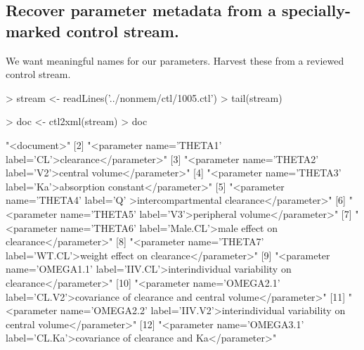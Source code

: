 \subsection{Recover parameter metadata from a specially-marked control stream.}
We want meaningful names for our parameters.  Harvest these from a reviewed control
stream.
\begin{Schunk}
\begin{Sinput}
> stream <- readLines('../nonmem/ctl/1005.ctl')
> tail(stream)
\end{Sinput}
\begin{Sinput}
> doc <- ctl2xml(stream)
> doc
\end{Sinput}
\begin{Soutput}
 [1] "<document>"                                                                                         
 [2] "<parameter name='THETA1' label='CL'>clearance</parameter>"                                          
 [3] "<parameter name='THETA2' label='V2'>central volume</parameter>"                                     
 [4] "<parameter name='THETA3' label='Ka'>absorption constant</parameter>"                                
 [5] "<parameter name='THETA4' label='Q' >intercompartmental clearance</parameter>"                       
 [6] "<parameter name='THETA5' label='V3'>peripheral volume</parameter>"                                  
 [7] "<parameter name='THETA6' label='Male.CL'>male effect on clearance</parameter>"                      
 [8] "<parameter name='THETA7' label='WT.CL'>weight effect on clearance</parameter>"                      
 [9] "<parameter name='OMEGA1.1' label='IIV.CL'>interindividual variability on clearance</parameter>"     
[10] "<parameter name='OMEGA2.1' label='CL.V2'>covariance of clearance and central volume</parameter>"    
[11] "<parameter name='OMEGA2.2' label='IIV.V2'>interindividual variability on central volume</parameter>"
[12] "<parameter name='OMEGA3.1' label='CL.Ka'>covariance of clearance and Ka</parameter>"                

\end{Soutput}
\end{Schunk}
